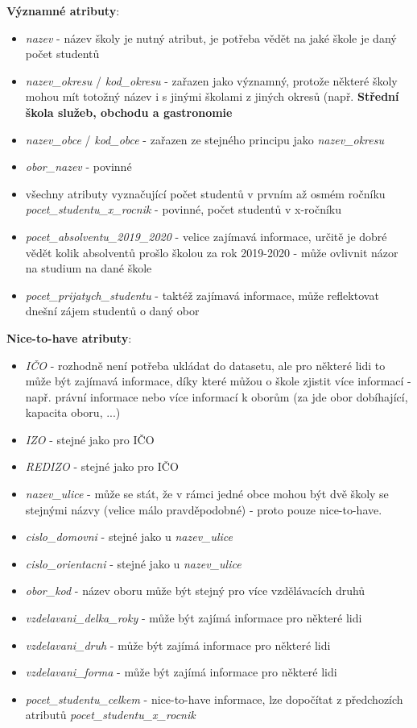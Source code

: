 \documentclass[12pt, a4paper]{article}
\begin{document}
\noindent \textbf{Významné atributy}:
\begin{itemize}
\item \textit{nazev} - název školy je nutný atribut, je potřeba vědět na jaké škole je daný počet studentů
\item \textit{nazev\_okresu} / \textit{kod\_okresu} - zařazen jako významný, protože některé školy mohou mít totožný název i s jinými školami z jiných okresů (např. \textbf{Střední škola služeb, obchodu a gastronomie}
\item \textit{nazev\_obce} / \textit{kod\_obce} - zařazen ze stejného principu jako \textit{nazev\_okresu}
\item \textit{obor\_nazev} - povinné
\item všechny atributy vyznačující počet studentů v prvním až osmém ročníku \textit{pocet\_studentu\_x\_rocnik} - povinné, počet studentů v x-ročníku
\item \textit{pocet\_absolventu\_2019\_2020} - velice zajímavá informace, určitě je dobré vědět kolik absolventů prošlo školou za rok 2019-2020 - může ovlivnit názor na studium na dané škole
\item \textit{pocet\_prijatych\_studentu} - taktéž zajímavá informace, může reflektovat dnešní zájem studentů o daný obor \\
\end{itemize}

\noindent \textbf{Nice-to-have atributy}:
\begin{itemize}
\item \textit{IČO} - rozhodně není potřeba ukládat do datasetu, ale pro některé lidi to může být zajímavá informace, díky které můžou o škole zjistit více informací - např. právní informace nebo více informací k oborům (za jde obor dobíhající, kapacita oboru, ...)
\item \textit{IZO} - stejné jako pro IČO
\item \textit{REDIZO} - stejné jako pro IČO 
\item \textit{nazev\_ulice} - může se stát, že v rámci jedné obce mohou být dvě školy se stejnými názvy (velice málo pravděpodobné) - proto pouze nice-to-have.
\item \textit{cislo\_domovni}  - stejné jako u \textit{nazev\_ulice}
\item \textit{cislo\_orientacni} - stejné jako u \textit{nazev\_ulice}
\item \textit{obor\_kod} - název oboru může být stejný pro více vzdělávacích druhů
\item \textit{vzdelavani\_delka\_roky} - může být zajímá informace pro některé lidi
\item \textit{vzdelavani\_druh} - může být zajímá informace pro některé lidi
\item \textit{vzdelavani\_forma} - může být zajímá informace pro některé lidi
\item \textit{pocet\_studentu\_celkem} - nice-to-have informace, lze dopočítat z předchozích atributů \textit{pocet\_studentu\_x\_rocnik} \\
\end{itemize}
\end{document}
